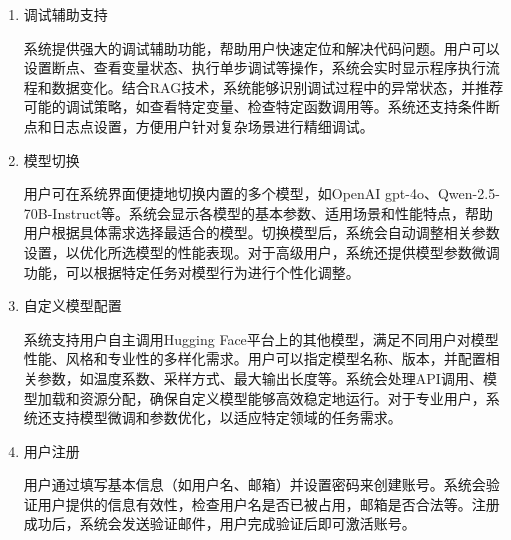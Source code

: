 \documentclass[
    report,     %
    oneside,    %
    UTF8,       %
    zihao=-4    %
]{config} %
\begin{document}
\begin{enumerate}[label=(\arabic*)]
    \item 调试辅助支持
    
    系统提供强大的调试辅助功能，帮助用户快速定位和解决代码问题。用户可以设置断点、查看变量状态、执行单步调试等操作，系统会实时显示程序执行流程和数据变化。结合RAG技术，系统能够识别调试过程中的异常状态，并推荐可能的调试策略，如查看特定变量、检查特定函数调用等。系统还支持条件断点和日志点设置，方便用户针对复杂场景进行精细调试。
    
    \item 模型切换
    
    用户可在系统界面便捷地切换内置的多个模型，如OpenAI gpt-4o、Qwen-2.5-70B-Instruct等。系统会显示各模型的基本参数、适用场景和性能特点，帮助用户根据具体需求选择最适合的模型。切换模型后，系统会自动调整相关参数设置，以优化所选模型的性能表现。对于高级用户，系统还提供模型参数微调功能，可以根据特定任务对模型行为进行个性化调整。
    
    \item 自定义模型配置
    
    系统支持用户自主调用Hugging Face平台上的其他模型，满足不同用户对模型性能、风格和专业性的多样化需求。用户可以指定模型名称、版本，并配置相关参数，如温度系数、采样方式、最大输出长度等。系统会处理API调用、模型加载和资源分配，确保自定义模型能够高效稳定地运行。对于专业用户，系统还支持模型微调和参数优化，以适应特定领域的任务需求。
    
    \item 用户注册
    
    用户通过填写基本信息（如用户名、邮箱）并设置密码来创建账号。系统会验证用户提供的信息有效性，检查用户名是否已被占用，邮箱是否合法等。注册成功后，系统会发送验证邮件，用户完成验证后即可激活账号。
    

\end{enumerate}
\end{document}
